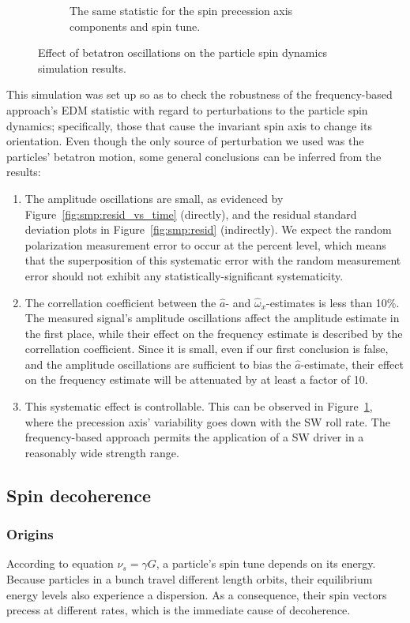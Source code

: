 \documentclass[preprint, review]{elsarticle}
\newcommand{\w}{\omega}
\begin{document}
\begin{figure}[h]
\begin{subfigure}{\linewidth}
    \caption{The same statistic for the spin precession axis components and spin tune.\label{fig:smp:NBAR}}
  \end{subfigure}
  \caption{Effect of betatron oscillations on the particle spin dynamics simulation results.\label{fig:smp}}
\end{figure}

This simulation was set up so as to check the robustness of the frequency-based approach's EDM statistic
with regard to perturbations to the particle spin dynamics; specifically, those that cause the invariant
spin axis to change its orientation. Even though the only source of perturbation we used was
the particles' betatron motion, some general conclusions can be inferred from the results:
\begin{enumerate}[(1)]
\item The amplitude oscillations are small, as evidenced by Figure~\ref{fig:smp:resid_vs_time} (directly),
  and the residual standard deviation plots in Figure~\ref{fig:smp:resid} (indirectly). We expect the
  random polarization measurement error to occur at the percent level, which means that the superposition
  of this systematic error with the random measurement error should not exhibit any
  statistically-significant systematicity.
\item The correllation coefficient between the $\hat a$- and $\hat\w_x$-estimates is less than 10\%.
  The measured signal's amplitude oscillations affect the amplitude estimate in the first place, while
  their effect on the frequency estimate is described by the correllation coefficient. Since it is small,
  even if our first conclusion is false, and the amplitude oscillations are sufficient to bias the
  $\hat a$-estimate, their effect on the frequency estimate will be attenuated by at least a factor of 10.
\item This systematic effect is controllable. This can be observed in Figure~\ref{fig:smp:NBAR}, where
  the precession axis' variability goes down with the SW roll rate. The frequency-based approach permits
  the application of a SW driver in a reasonably wide strength range.
\end{enumerate}

\subsection{Spin decoherence}
\subsubsection{Origins}
According to equation $\nu_s = \gamma G$, a particle's spin tune depends on its energy. Because particles in
a bunch travel different length orbits, their equilibrium energy levels also experience a dispersion. As a
consequence, their spin vectors precess at different rates,
which is the immediate cause of decoherence.~\cite{Senichev:IPAC13}
\end{document}
